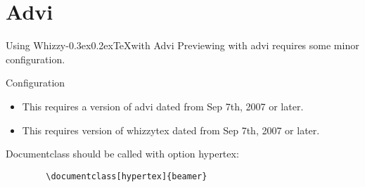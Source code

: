 \documentclass[xcolor=pst]{beamer}
\makeatletter
\def \WhizzyTeX {{Whizzy\kern -0.3ex\raise 0.2ex\hbox{\let \@\relax\TeX}}}
\makeatother
\begin{document}
\section{Advi}
\begin{frame}{Using \WhizzyTeX with Advi}
Previewing with advi requires some minor configuration. 
\end{frame}
\begin{frame}[fragile=singleslide]{Configuration}
\begin{itemize}
\item This requires a version of advi  dated from Sep 7th, 2007 or later.
\item This requires version of whizzytex dated from Sep 7th, 2007 or later. 
\end{itemize}
Documentclass should be called with option hypertex:
\begin{verbatim}
        \documentclass[hypertex]{beamer}
\end{verbatim}
\end{frame}
\end{document}
